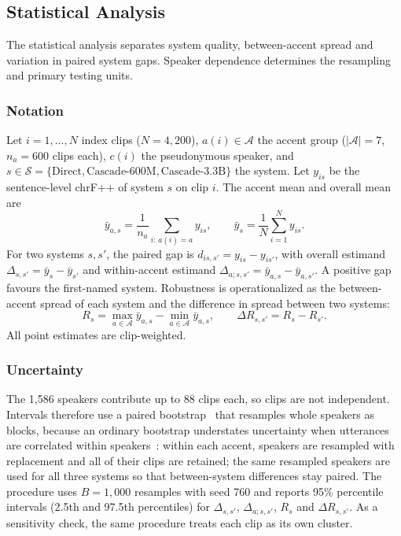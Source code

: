 \subsection{Statistical Analysis}
\label{sec:statistics}

The statistical analysis separates system quality, between-accent spread and
variation in paired system gaps. Speaker dependence determines the resampling
and primary testing units.

\subsubsection{Notation}
Let $i=1,\dots,N$ index clips ($N=4{,}200$), $a(i)\in\mathcal{A}$ the accent group ($|\mathcal{A}|=7$, $n_a=600$ clips each), $c(i)$ the pseudonymous speaker, and $s\in\mathcal{S}=\{\mbox{Direct},\mbox{Cascade-600M},\mbox{Cascade-3.3B}\}$ the system. Let $y_{is}$ be the sentence-level chrF++ of system $s$ on clip $i$. The accent mean and overall mean are
\begin{equation}
\bar y_{a,s}=\frac{1}{n_a}\sum_{i:\,a(i)=a} y_{is},\qquad
\bar y_{s}=\frac{1}{N}\sum_{i=1}^{N} y_{is}.
\end{equation}
For two systems $s,s'$, the paired gap is $d_{is,s'}=y_{is}-y_{is'}$, with overall estimand $\Delta_{s,s'}=\bar y_s-\bar y_{s'}$ and within-accent estimand $\Delta_{a;s,s'}=\bar y_{a,s}-\bar y_{a,s'}$. A positive gap favours the first-named system. Robustness is operationalized as the between-accent spread of each system and the difference in spread between two systems:
\begin{equation}
R_s=\max_{a\in\mathcal{A}}\bar y_{a,s}-\min_{a\in\mathcal{A}}\bar y_{a,s},\qquad
\Delta R_{s,s'}=R_s-R_{s'}.
\end{equation}
All point estimates are clip-weighted.

\subsubsection{Uncertainty}
The 1,586 speakers contribute up to 88 clips each, so clips are not independent. Intervals therefore use a paired bootstrap~\cite{koehn2004significance} that resamples whole speakers as blocks, because an ordinary bootstrap understates uncertainty when utterances are correlated within speakers~\cite{liu2019blockwise}: within each accent, speakers are resampled with replacement and all of their clips are retained; the same resampled speakers are used for all three systems so that between-system differences stay paired. The procedure uses $B=1{,}000$ resamples with seed 760 and reports 95\% percentile intervals (2.5th and 97.5th percentiles) for $\Delta_{s,s'}$, $\Delta_{a;s,s'}$, $R_s$ and $\Delta R_{s,s'}$. As a sensitivity check, the same procedure treats each clip as its own cluster.


